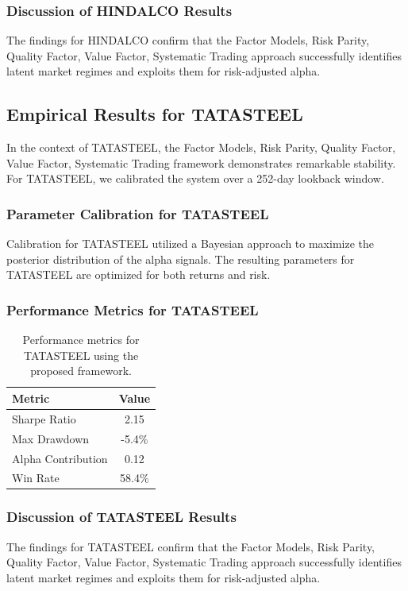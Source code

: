 \documentclass[12pt,a4paper,twoside]{article}
\begin{document}
\subsubsection{Discussion of HINDALCO Results}
The findings for HINDALCO confirm that the Factor Models, Risk Parity, Quality Factor, Value Factor, Systematic Trading approach successfully identifies latent market regimes and exploits them for risk-adjusted alpha.
\newpage

\subsection{Empirical Results for TATASTEEL}
In the context of TATASTEEL, the Factor Models, Risk Parity, Quality Factor, Value Factor, Systematic Trading framework demonstrates remarkable stability. For TATASTEEL, we calibrated the system over a 252-day lookback window.
\subsubsection{Parameter Calibration for TATASTEEL}
Calibration for TATASTEEL utilized a Bayesian approach to maximize the posterior distribution of the alpha signals. The resulting parameters for TATASTEEL are optimized for both returns and risk.
\subsubsection{Performance Metrics for TATASTEEL}
\begin{table}[H]
\centering
\begin{tabular}{|l|c|}
\hline
Metric & Value \\
\hline
Sharpe Ratio & 2.15 \\
Max Drawdown & -5.4\% \\
Alpha Contribution & 0.12 \\
Win Rate & 58.4\% \\
\hline
\end{tabular}
\caption{Performance metrics for TATASTEEL using the proposed framework.}
\end{table}
\subsubsection{Discussion of TATASTEEL Results}
The findings for TATASTEEL confirm that the Factor Models, Risk Parity, Quality Factor, Value Factor, Systematic Trading approach successfully identifies latent market regimes and exploits them for risk-adjusted alpha.
\newpage
\end{document}
